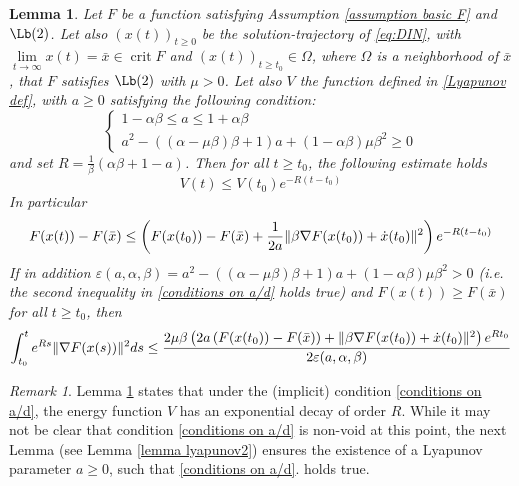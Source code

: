 \documentclass[reqno]{amsart}
\theoremstyle{plain}
\newtheorem{lemma}{Lemma}	%
\theoremstyle{definition}
\theoremstyle{remark}
\newtheorem{remark}{Remark}	%
\DeclareMathOperator{\crit}{crit}	%
\DeclarePairedDelimiter{\norm}{\lVert}{\rVert}	%
\begin{document}
\begin{lemma}\label{lemma general conditions}
 Let $F$ be a function satisfying Assumption \eqref{assumption basic F} and \hyperref[PL]{$\Lb(2)$}.  Let also $\left(x(t)\right)_{t\geq0}$ be the solution-trajectory of \eqref{eq:DIN}, with $\lim\limits_{t\to\infty}x(t)=\bar{x}\in \crit{F}$
 and $\left(x(t)\right)_{t\geq t_{0}} \in \Omega$, where $\Omega$ is a neighborhood of $\bar{x}$, that $F$ satisfies $\Lb(2)$ with $\mu>0$. Let also $V$ the function defined in \eqref{Lyapunov def}, with  $a\geq0$ satisfying the following condition:
 \begin{equation}\label{conditions on a/d}\tag{H$1$}
 \begin{cases}
 1-\alpha\beta \leq a \leq 1+\alpha\beta \\
 a^2 - \left((\alpha-\mu\beta)\beta +1\right)a + (1-\alpha\beta)\mu\beta^{2} \geq 0
 \end{cases}
 \end{equation} 
 and set $R=\frac{1}{\beta}\left(\alpha\beta+1-a\right)$.
 Then for all $t\geq t_{0}$, the following estimate holds
 \begin{equation}\label{decay of V}
 V(t) \leq V(t_{0})e^{-R(t-t_{0})}
 \end{equation}
 In particular 
 \begin{equation}
 F(x(t))- F(\bar{x}) \leq \left(F(x(t_{0})) - F(\bar{x}) + \frac{1}{2a}\norm{\beta\nabla F(x(t_{0}))+\dot{x}(t_{0})}^2\right)e^{-R(t-t_{0})}
 \end{equation}
 If in addition $\varepsilon(a,\alpha,\beta)=a^2 - \left((\alpha-\mu\beta)\beta +1\right)a + (1-\alpha\beta)\mu\beta^{2}>0$ (i.e. the second inequality in \eqref{conditions on a/d} holds true) and $F(x(t))\geq F(\bar{x})$ for all $t\geq t_{0}$, then 
 \begin{equation}\label{estimate grad lemma1}
 	\int_{t_{0}}^{t}e^{Rs}\norm{\nabla F(x(s))}^{2}ds \leq \frac{ 2\mu\beta\left(2a\left(F(x(t_{0})) - F(\bar{x})\right) + \norm{\beta\nabla F(x(t_{0}))+\dot{x}(t_{0})}^2\right)e^{Rt_{0}}}{2\varepsilon(a,\alpha,\beta)}
 \end{equation}
\end{lemma}




\begin{remark}
Lemma \ref{lemma general conditions} states that under the (implicit) condition \eqref{conditions on a/d}, the energy function $V$ has an exponential decay of order $R$. While it may not be clear that condition \eqref{conditions on a/d} is non-void at this point, the next Lemma (see Lemma \ref{lemma lyapunov2}) ensures the existence of a Lyapunov parameter $a \geq 0$, such that \eqref{conditions on a/d}. holds true.
\end{remark}
\end{document}

